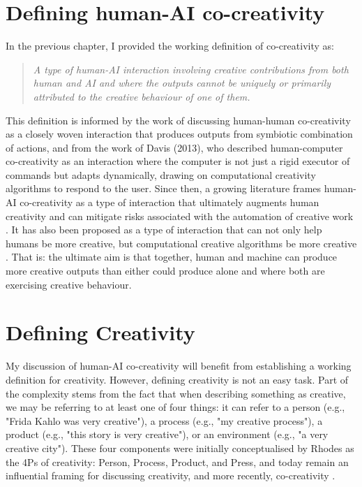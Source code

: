 \section{Defining human-AI co-creativity}

In the previous chapter, I provided the working definition of co-creativity as:

\begin{quote}
\emph{A type of human-AI interaction involving creative contributions from both human and AI and where the outputs cannot be uniquely or primarily attributed to the creative behaviour of one of them.}
\end{quote}

This definition is informed by the work of \cite{Candy2002-ra} discussing human-human co-creativity as a closely woven interaction that produces outputs from symbiotic combination of actions, and from the work of Davis (2013), \cite{Davis2013-jy} who described human-computer co-creativity as an interaction where the computer is not just a rigid executor of commands but adapts dynamically, drawing on computational creativity algorithms to respond to the user. Since then, a growing literature frames human-AI co-creativity as a type of interaction that ultimately augments human creativity and can mitigate risks associated with the automation of creative work \cite{Yannakakis2014-zs, Kantosalo2020-zf, Rezwana2022-gg, Moruzzi2024-cq, Haase2024-yp, Lin2023-zq, Karimi2018-wi}. It has also been proposed as a type of interaction that can not only help humans be more creative, but computational creative algorithms be more creative \cite{Liapis2016-zt}. That is: the ultimate aim is that together, human and machine can produce more creative outputs than either could produce alone and where both are exercising creative behaviour. 

\section{Defining Creativity}

My discussion of human-AI co-creativity will benefit from establishing a working definition for creativity. However, defining creativity is not an easy task. Part of the complexity stems from the fact that when describing something as creative, we may be referring to at least one of four things: it can refer to a person (e.g., "Frida Kahlo was very creative"), a process (e.g., "my creative process"), a product (e.g., "this story is very creative"), or an environment (e.g., "a very creative city"). These four components were initially conceptualised by Rhodes \cite{Rhodes1961-od} as the 4Ps of creativity: Person, Process, Product, and Press, and today remain an influential framing for discussing creativity, and more recently, co-creativity \cite{Kantosalo2019-pz}. 

